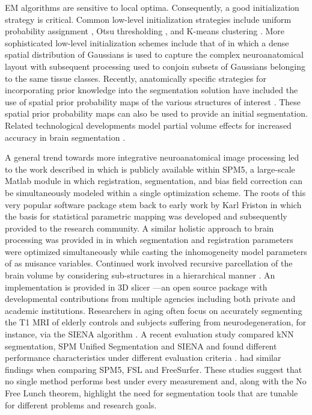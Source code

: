 \documentclass[11pt,english]{article}
\begin{document}
EM algorithms are sensitive to local optima. Consequently, a good initialization
strategy is critical.  Common low-level initialization strategies include uniform
probability assignment \citep{Wells1996}, Otsu thresholding
\citep{Zhang2001}, and K-means clustering \citep{Pappas1992}.  More
sophisticated low-level initialization schemes include that of
\cite{Greenspan2006} in which a dense spatial distribution of
Gaussians is used to capture the complex neuroanatomical layout with
subsequent processing used to conjoin subsets of Gaussians belonging
to the same tissue classes.  Recently, anatomically specific
strategies for incorporating prior knowledge into the segmentation
solution have included the use of spatial prior probability maps of
the various structures of interest
\citep{Leemput1999a,Marroquin2002,Ashburner2005}.  These spatial prior
probability maps can also be used to provide an initial segmentation.
Related technological developments model partial
volume effects for increased accuracy in brain segmentation
\citep{Ruan2000,Ballester2002,Leemput2003}.

A general trend towards more integrative neuroanatomical image processing led to the work described in
\cite{Ashburner2005} which is publicly available within SPM5, a
large-scale Matlab module in which registration, segmentation, and
bias field correction can be simultaneously modeled within a single
optimization scheme. The roots of this very popular software package
stem back to early work by Karl Friston in which the basis for
statistical parametric mapping was developed \citep{Friston1990} and
subsequently provided to the research community. A similar holistic
approach to brain processing was provided in \cite{Pohl2006} in which
segmentation and registration parameters were optimized simultaneously
while casting the inhomogeneity model parameters of \cite{Wells1996}
as nuisance variables.  Continued work involved recursive parcellation
of the brain volume by considering sub-structures in a hierarchical
manner \citep{Pohl2007}.  An implementation is provided in 3D slicer
\citep{Pieper2006}---an open source package with developmental
contributions from multiple agencies including both private and
academic institutions. Researchers in aging often focus on
accurately segmenting the T1 MRI of elderly controls and subjects
suffering from neurodegeneration, for instance, via the SIENA algorithm
\citep{Smith2007}.  A recent evaluation study 
compared kNN segmentation, SPM Unified Segmentation and SIENA and
found different performance
characteristics under different evaluation criteria
\citep{Bresser2011}.  \cite{Klauschen2009} had similar findings when
comparing SPM5, FSL and FreeSurfer.  These studies suggest that no
single method performs best under every measurement and, along with the No
Free Lunch theorem, highlight the need for segmentation tools that are tunable for different
problems and research goals.  
\end{document}
